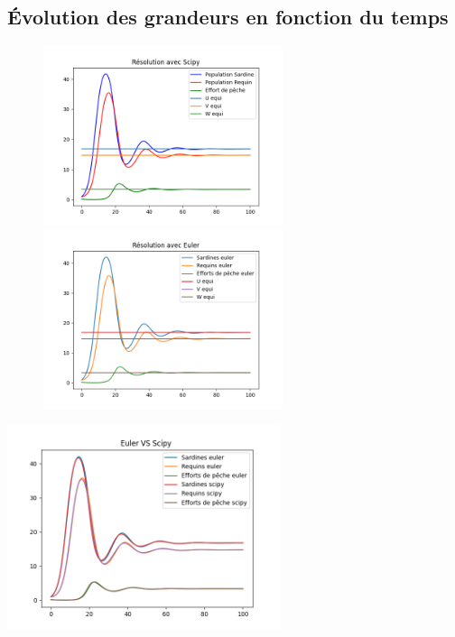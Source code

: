 \documentclass[a4paper, 11pt]{report}%
\begin{document}
        
        \subsection{Évolution des grandeurs en fonction du temps}
        
        \begin{figure}[!h]
    		\begin{minipage}[b]{.4\textwidth}
        		\centering
        		\includegraphics[width=7cm]{figures/Scipy_good_conditions.png}
    		\end{minipage}
    		\hfill
    		\begin{minipage}[b]{.4\textwidth}
        		\centering
       			\includegraphics[width=7cm]{figures/Euler_good_conditions.png}
    		\end{minipage}
    		
		\end{figure}

        \begin{center}
            \includegraphics[width=8cm]{figures/Euler_VS_Scipy_good_conditions.png}
        \end{center}
\end{document}
